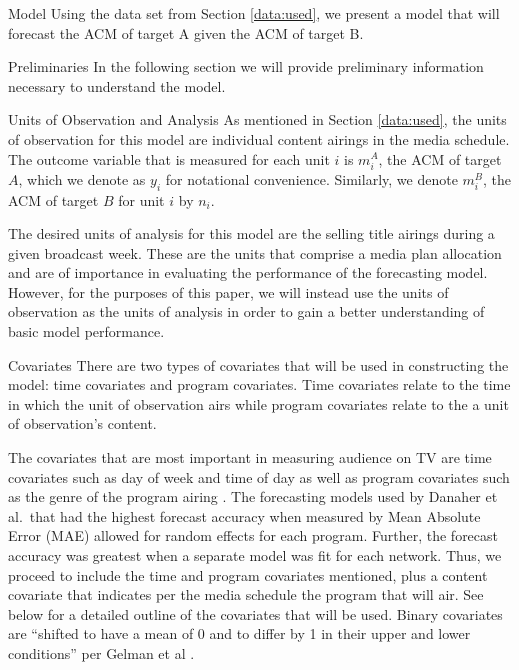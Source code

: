 \begin{chapter}{Model}
  Using the data set from Section \ref{data:used}, we present a model that will
  forecast the ACM of target A given the ACM of target B.

\begin{section}{Preliminaries}
  In the following section we will provide preliminary information necessary to
  understand the model.

  \begin{subsection}{Units of Observation and Analysis}
    As mentioned in Section \ref{data:used}, the units of observation for this model
    are individual content airings in the media schedule. The outcome
    variable that is measured for each unit $i$ is $m_i^A$, the ACM of target $A$, which we
    denote as $y_i$ for notational convenience. Similarly, we denote $m_i^B$, the ACM of
    target $B$ for unit $i$ by $n_i$.

    The desired units of analysis for this model are the selling title airings during a given broadcast week.
    These are the units that comprise a media plan allocation and are of importance in evaluating
    the performance of the forecasting model. However, for the purposes of this paper,
    we will instead use the units of observation as the units of analysis in order to gain
    a better understanding of basic model performance.
  \end{subsection}

  \begin{subsection}{Covariates}\label{model:covariates}
    There are two types of covariates that will be used in constructing the model: time covariates and program
    covariates. Time covariates relate to the time in which the unit of observation airs
    while program covariates relate to the a unit of observation's content.

    The covariates that are most important in measuring audience on TV are time covariates
    such as day of week and time of day as well as program covariates such as the genre of
    the program airing \cite{tvforecasting}.
    The forecasting models used by Danaher et al.\ that had the highest forecast accuracy when measured by Mean Absolute Error (MAE)
    allowed for random effects for each program. Further, the forecast accuracy was greatest when a
    separate model was fit for each network.
    Thus, we proceed to include the time and program covariates mentioned, plus a content
    covariate that indicates per the media schedule the program that will air. See below
    for a detailed outline of the covariates that will be used. Binary
    covariates are ``shifted to have a mean of 0 and to differ by 1 in their upper and lower conditions'' per Gelman et al \cite{bda3}.


\end{subsection}
\end{section}
\end{chapter}
